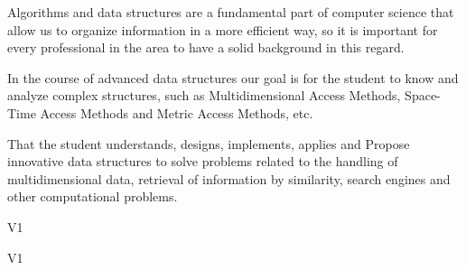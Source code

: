 \begin{syllabus}


\begin{justification}
Algorithms and data structures are a fundamental part of computer science that allow us to organize information in a more efficient way, so it is important for every professional in the area to have a solid background in this regard.

In the course of advanced data structures our goal is for the student to know and analyze complex structures, such as Multidimensional Access Methods, Space-Time Access Methods and Metric Access Methods, etc.
\end{justification}

\begin{goals}
\item That the student understands, designs, implements, applies and
Propose innovative data structures to solve problems related to the handling of multidimensional data, retrieval of information by similarity, search engines and
other computational problems.
\end{goals}

\begin{outcomes}{V1}
   \item {}
   \item {}
   \item {}
   \item {}
\end{outcomes}

\begin{competences}{V1}
    \item {} 
    \item {}
    \item {}
\end{competences}


\end{syllabus}
